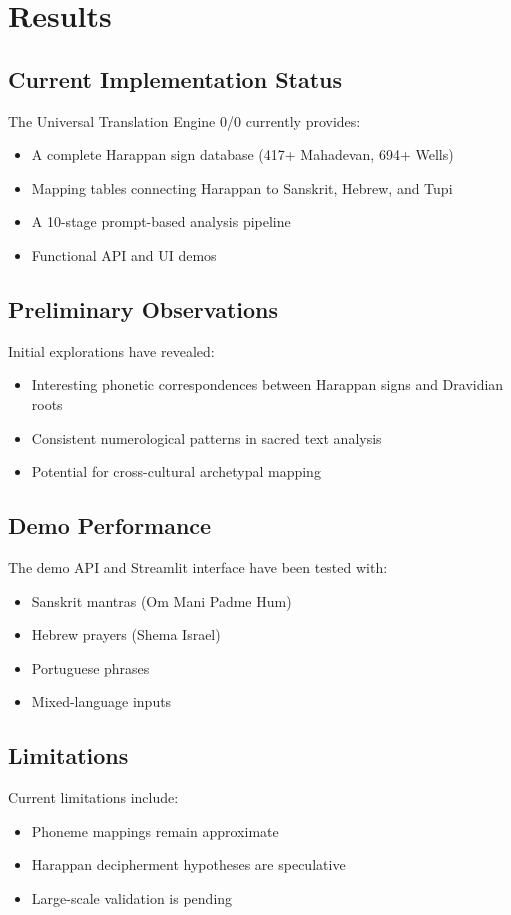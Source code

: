 \section{Results}
\label{sec:results}


\subsection{Current Implementation Status}
The Universal Translation Engine 0/0 currently provides:
\begin{itemize}
  \item A complete Harappan sign database (417+ Mahadevan, 694+ Wells)
  \item Mapping tables connecting Harappan to Sanskrit, Hebrew, and Tupi
  \item A 10-stage prompt-based analysis pipeline
  \item Functional API and UI demos
\end{itemize}

\subsection{Preliminary Observations}
Initial explorations have revealed:
\begin{itemize}
  \item Interesting phonetic correspondences between Harappan signs
        and Dravidian roots
  \item Consistent numerological patterns in sacred text analysis
  \item Potential for cross-cultural archetypal mapping
\end{itemize}

\subsection{Demo Performance}
The demo API and Streamlit interface have been tested with:
\begin{itemize}
  \item Sanskrit mantras (Om Mani Padme Hum)
  \item Hebrew prayers (Shema Israel)
  \item Portuguese phrases
  \item Mixed-language inputs
\end{itemize}

\subsection{Limitations}
Current limitations include:
\begin{itemize}
  \item Phoneme mappings remain approximate
  \item Harappan decipherment hypotheses are speculative
  \item Large-scale validation is pending
\end{itemize}
